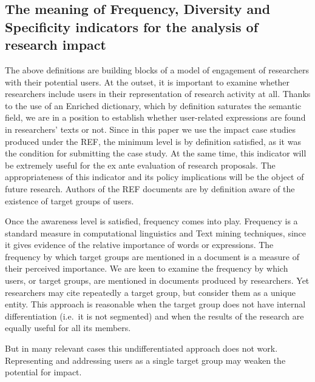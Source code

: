 \documentclass[]{book}
\theoremstyle{definition}
\theoremstyle{definition}
\theoremstyle{definition}
\theoremstyle{remark}
\begin{document}
\subsection{The meaning of Frequency, Diversity and Specificity
indicators for the analysis of research
impact}\label{the-meaning-of-frequency-diversity-and-specificity-indicators-for-the-analysis-of-research-impact}

The above definitions are building blocks of a model of engagement of
researchers with their potential users. At the outset, it is important
to examine whether researchers include users in their representation of
research activity at all. Thanks to the use of an Enriched dictionary,
which by definition saturates the semantic field, we are in a position
to establish whether user-related expressions are found in researchers'
texts or not. Since in this paper we use the impact case studies
produced under the REF, the minimum level is by definition satisfied, as
it was the condition for submitting the case study. At the same time,
this indicator will be extremely useful for the ex ante evaluation of
research proposals. The appropriateness of this indicator and its policy
implications will be the object of future research. Authors of the REF
documents are by definition aware of the existence of target groups of
users.

Once the awareness level is satisfied, frequency comes into play.
Frequency is a standard measure in computational linguistics and Text
mining techniques, since it gives evidence of the relative importance of
words or expressions. The frequency by which target groups are mentioned
in a document is a measure of their perceived importance. We are keen to
examine the frequency by which users, or target groups, are mentioned in
documents produced by researchers. Yet researchers may cite repeatedly a
target group, but consider them as a unique entity. This approach is
reasonable when the target group does not have internal differentiation
(i.e.~it is not segmented) and when the results of the research are
equally useful for all its members.

But in many relevant cases this undifferentiated approach does not work.
Representing and addressing users as a single target group may weaken
the potential for impact.
\end{document}
